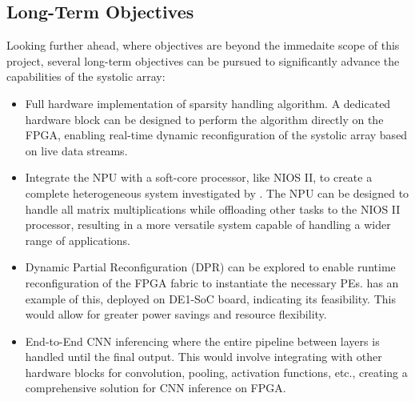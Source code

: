 \documentclass[12pt, a4paper, ukenglish]{article}
\begin{document}
    \subsection{Long-Term Objectives} \label{sec: long-term}
    Looking further ahead, where objectives are beyond the immedaite scope of this project, several long-term objectives can be pursued to significantly advance the capabilities of the systolic array:
    \begin{itemize}
        \item Full hardware implementation of sparsity handling algorithm. A dedicated hardware block can be designed to perform the algorithm directly on the FPGA, enabling real-time dynamic reconfiguration of the systolic array based on live data streams.
        \item Integrate the NPU with a soft-core processor, like NIOS II, to create a complete heterogeneous system investigated by \textcite{liu_energy-efficient_2024}. The NPU can be designed to handle all matrix multiplications while offloading other tasks to the NIOS II processor, resulting in a more versatile system capable of handling a wider range of applications. %
        \item Dynamic Partial Reconfiguration (DPR) can be explored to enable runtime reconfiguration of the FPGA fabric to instantiate the necessary PEs. \textcite{beasley_developing_nodate} has an example of this, deployed on DE1-SoC board, indicating its feasibility. This would allow for greater power savings and resource flexibility.
        \item End-to-End CNN inferencing where the entire pipeline between layers is handled until the final output. This would involve integrating with other hardware blocks for convolution, pooling, activation functions, etc., creating a comprehensive solution for CNN inference on FPGA.
    \end{itemize}




    



\newpage
{}
\printbibliography


\end{document}
